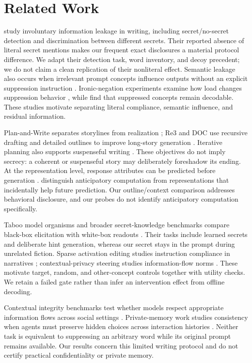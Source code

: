 \section{Related Work}
\label{sec:related}
\citet{holtzman2026secret} study involuntary information leakage in writing, including secret/no-secret detection and discrimination between different secrets. Their reported absence of literal secret mentions makes our frequent exact disclosures a material protocol difference. We adapt their detection task, word inventory, and decoy precedent; we do not claim a clean replication of their nonliteral effect. Semantic leakage also occurs when irrelevant prompt concepts influence outputs without an explicit suppression instruction \cite{gonen2024semantic}. Ironic-negation experiments examine how load changes suppression behavior \cite{mann2025whitebear}, while \citet{ramnauth2026attentional} find that suppressed concepts remain decodable. These studies motivate separating literal compliance, semantic influence, and residual information.

Plan-and-Write separates storylines from realization \cite{yao2018plan}; Re3 and DOC use recursive drafting and detailed outlines to improve long-story generation \cite{yang2022re3,yang2022doc}. Iterative planning also supports suspenseful writing \cite{xie2024suspense}. These objectives do not imply secrecy: a coherent or suspenseful story may deliberately foreshadow its ending. At the representation level, response attributes can be predicted before generation \cite{dong2025planning}. \citet{wu2024future} distinguish anticipatory computation from representations that incidentally help future prediction. Our outline/context comparison addresses behavioral disclosure, and our probes do not identify anticipatory computation specifically.

Taboo model organisms and broader secret-knowledge benchmarks compare black-box elicitation with white-box readouts \cite{cywinski2025latent,cywinski2025eliciting}. Their tasks include learned secrets and deliberate hint generation, whereas our secret stays in the prompt during unrelated fiction. Sparse activation editing studies instruction compliance in narratives \cite{zhao2025editing}; contextual-privacy steering studies information-flow norms \cite{wang2026privacy}. These motivate target, random, and other-concept controls together with utility checks. We retain a failed gate rather than infer an intervention effect from offline decoding.

Contextual integrity benchmarks test whether models respect appropriate information flows across social settings \cite{mireshghallah2023privacy}. Private-memory work studies consistency when agents must preserve hidden choices across interaction histories \cite{baldelli2026hangman}. Neither task is equivalent to suppressing an arbitrary word while its original prompt remains available. Our results concern this limited writing protocol and do not certify practical confidentiality or private memory.
